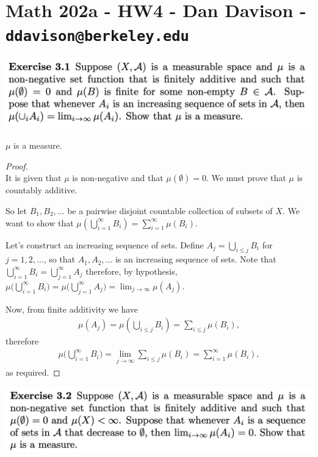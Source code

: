 \section*{Math 202a - HW4 - Dan Davison - \texttt{ddavison@berkeley.edu}}
\begin{mdframed}
  \includegraphics[width=400pt]{img/analysis--berkeley-202a-hw04-f604.png}
\end{mdframed}
\begin{claim*}
  $\mu$ is a measure.
\end{claim*}
\begin{proof}~\\
  It is given that $\mu$ is non-negative and that $\mu(\emptyset) = 0$. We must prove that $\mu$ is countably
  additive.

  So let $B_1, B_2, \dots$ be a pairwise disjoint countable collection of subsets of $X$. We want to show
  that $\mu(\bigcup_{i=1}^\infty B_i) = \sum_{i=1}^\infty \mu(B_i)$.

  Let's construct an increasing sequence of sets. Define $A_j = \bigcup_{i \leq j} B_i$ for $j=1, 2, \dots$, so
  that $A_1, A_2, \dots$ is an increasing sequence of sets. Note
  that $\bigcup_{i=1}^\infty B_i = \bigcup_{j=1}^\infty A_j$ therefore, by
  hypothesis,
  $\mu\big(\bigcup_{i=1}^\infty B_i\big) = \mu\big(\bigcup_{j=1}^\infty A_j\big) = \lim_{j\to\infty} \mu(A_j)$.

  Now, from finite additivity we have
  \begin{align*}
    \mu(A_j) = \mu(\bigcup_{i \leq j} B_i) = \sum_{i\leq j} \mu(B_i),
  \end{align*}
  therefore
  \begin{align*}
    \mu\big(\bigcup_{i=1}^\infty B_i\big) = \lim_{j\to\infty} \sum_{i\leq j} \mu(B_i) = \sum_{i=1}^\infty \mu(B_i),
  \end{align*}
  as required.
\end{proof}

\newpage
\begin{mdframed}
\includegraphics[width=400pt]{img/analysis--berkeley-202a-hw04-c187.png}
\end{mdframed}

